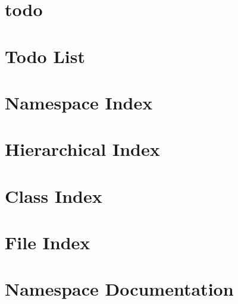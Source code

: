 \documentclass[twoside]{book}
\newcommand{\+}{\discretionary{\mbox{\scriptsize$\hookleftarrow$}}{}{}}
\begin{document}
\chapter{todo}
\label{md__c___users__guille__lattice_assembly__2___assets__resources__objects__i_l_l_a_v3__l_s_s2_m_c_a8871d1ba0badf0a7b9528917253c021}

\chapter{Todo List}
\label{todo}

\chapter{Namespace Index}

\chapter{Hierarchical Index}

\chapter{Class Index}

\chapter{File Index}

\chapter{Namespace Documentation}





















\end{document}
